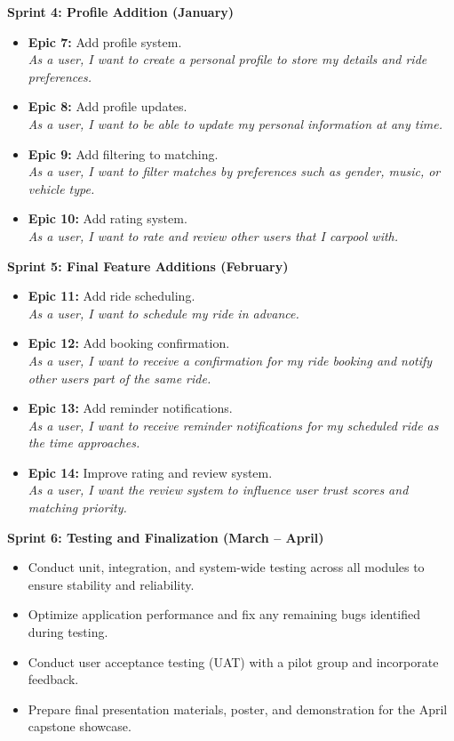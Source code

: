 \documentclass[12pt,letterpaper]{article}
\begin{document}
\textbf{Sprint 4: Profile Addition (January)}
\begin{itemize}
    \item \textbf{Epic 7:} Add profile system. \\
    \textit{As a user, I want to create a personal profile to store my details and ride preferences.}

    \item \textbf{Epic 8:} Add profile updates. \\
    \textit{As a user, I want to be able to update my personal information at any time.}

    \item \textbf{Epic 9:} Add filtering to matching. \\
    \textit{As a user, I want to filter matches by preferences such as gender, music, or vehicle type.}

    \item \textbf{Epic 10:} Add rating system. \\
    \textit{As a user, I want to rate and review other users that I carpool with.}
\end{itemize}

\textbf{Sprint 5: Final Feature Additions (February)}
\begin{itemize}
    \item \textbf{Epic 11:} Add ride scheduling. \\
    \textit{As a user, I want to schedule my ride in advance.}

    \item \textbf{Epic 12:} Add booking confirmation. \\
    \textit{As a user, I want to receive a confirmation for my ride booking and notify other users part of the same ride.}

    \item \textbf{Epic 13:} Add reminder notifications. \\
    \textit{As a user, I want to receive reminder notifications for my scheduled ride as the time approaches.}

    \item \textbf{Epic 14:} Improve rating and review system. \\
    \textit{As a user, I want the review system to influence user trust scores and matching priority.}
\end{itemize}

\textbf{Sprint 6: Testing and Finalization (March – April)}
\begin{itemize}
    \item Conduct unit, integration, and system-wide testing across all modules to ensure stability and reliability.
    \item Optimize application performance and fix any remaining bugs identified during testing.
    \item Conduct user acceptance testing (UAT) with a pilot group and incorporate feedback.
    \item Prepare final presentation materials, poster, and demonstration for the April capstone showcase.
\end{itemize}
\end{document}
